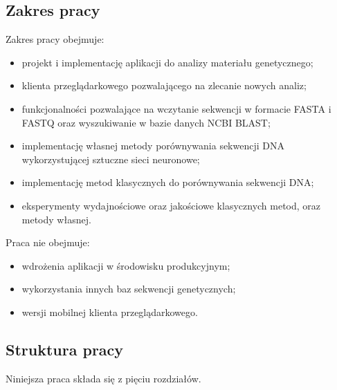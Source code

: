         \subsection {Zakres pracy}
        
        Zakres pracy obejmuje:
        \begin{itemize}
            \item {
                projekt i implementację aplikacji do analizy materiału genetycznego;
            }
            \item {
                klienta przeglądarkowego pozwalającego na zlecanie nowych analiz;
            }
            \item {
                funkcjonalności pozwalające na wczytanie sekwencji w formacie FASTA i FASTQ oraz wyszukiwanie w bazie danych NCBI BLAST;
            }
            \item {
                implementację własnej metody porównywania sekwencji DNA wykorzystującej sztuczne sieci neuronowe;
            }
            \item {
                implementację metod klasycznych do porównywania sekwencji DNA;
            }
            \item {
                eksperymenty wydajnościowe oraz jakościowe klasycznych metod, oraz metody własnej.
            }
        \end{itemize}

        Praca nie obejmuje:
        \begin{itemize}
            \item {
                wdrożenia aplikacji w środowisku produkcyjnym;
            }
            \item {
                wykorzystania innych baz sekwencji genetycznych;
            }
            \item {
                wersji mobilnej klienta przeglądarkowego.
            }
        \end{itemize}

    \subsection {Struktura pracy}

        Niniejsza praca składa się z pięciu rozdziałów.

